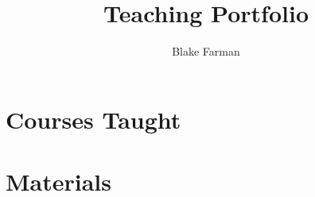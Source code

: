 \documentclass[10pt]{amsart}
\author{Blake Farman}
\title{Teaching Portfolio}
\date{}
\begin{document}
\maketitle

\tableofcontents

\section{Courses Taught}

\section{Materials}

%
\end{document}
